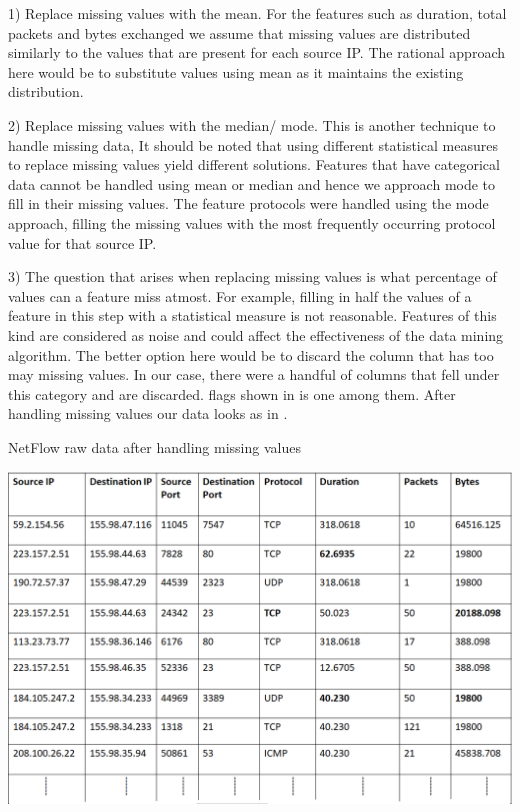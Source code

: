 1) Replace missing values with the mean. For the features such as duration, total packets and bytes exchanged we assume that missing values are distributed similarly to the values that are present for each source IP. The rational approach here would be to substitute values using mean as it maintains the existing distribution.

2) Replace missing values with the median/ mode. This is another technique to handle missing data, It should be noted that using different statistical measures to replace missing values yield different solutions. Features that have categorical data cannot be handled using mean or median and hence we approach mode to fill in their missing values. The feature protocols were handled using the mode approach, filling the missing values with the most frequently occurring protocol value for that source IP.

3) The question that arises when replacing missing values is what percentage of values can a feature miss atmost. For example, filling in half the values of a feature in this step with a statistical measure is not reasonable. Features of this kind are considered as noise and could affect the effectiveness of the data mining algorithm. The better option here would be to discard the column that has too may missing values. In our case, there were a handful of columns that fell under this category and are discarded. flags shown in  is one among them. After handling missing values our data looks as in .

\begin{table}[t]
	\caption{NetFlow raw data after handling missing values}%
	\centerline{\includegraphics[scale = 0.6]{missing_data.png}}
	
\end{table}


